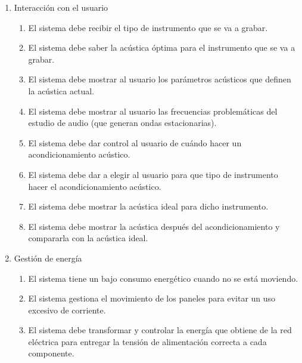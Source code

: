 \begin{enumerate}[{F}1.]
    \item Interacción con el usuario
    \begin{enumerate}[{C}1.]
        \item El sistema debe recibir el tipo de instrumento que se va a grabar.
        \item El sistema debe saber la acústica óptima para el instrumento que se va a grabar.
        \item El sistema debe mostrar al usuario los parámetros acústicos que definen la acústica actual.
        \item El sistema debe mostrar al usuario las frecuencias problemáticas del estudio de audio (que generan ondas estacionarias).
        \item El sistema debe dar control al usuario de cuándo hacer un acondicionamiento acústico.
        \item El sistema debe dar a elegir al usuario para que tipo de instrumento hacer el acondicionamiento acústico.
        \item El sistema debe mostrar la acústica ideal para dicho instrumento.
        \item El sistema debe mostrar la acústica después del acondicionamiento y compararla con la acústica ideal. 
    \end{enumerate}

    \item Gestión de energía
    \begin{enumerate}[{C}1.]
        \item El sistema tiene un bajo consumo energético cuando no se está moviendo.
        \item El sistema gestiona el movimiento de los paneles para evitar un uso excesivo de corriente.
        \item El sistema debe transformar y controlar la energía que obtiene de la red eléctrica para entregar la tensión de alimentación correcta a cada componente.
    \end{enumerate}
\end{enumerate}


